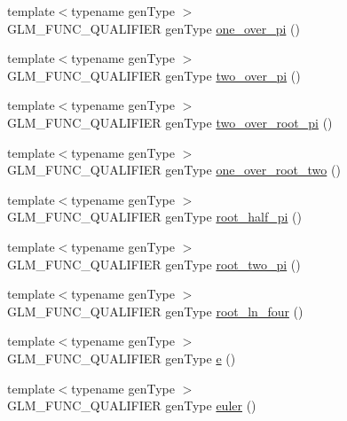 \begin{DoxyCompactItemize}
{\footnotesize template$<$typename gen\-Type $>$ }\\G\-L\-M\-\_\-\-F\-U\-N\-C\-\_\-\-Q\-U\-A\-L\-I\-F\-I\-E\-R gen\-Type \hyperlink{group__gtc__constants_ga9ba09a027db6d4f4e259b01cf5d6c178}{one\-\_\-over\-\_\-pi} ()
\item 
{\footnotesize template$<$typename gen\-Type $>$ }\\G\-L\-M\-\_\-\-F\-U\-N\-C\-\_\-\-Q\-U\-A\-L\-I\-F\-I\-E\-R gen\-Type \hyperlink{group__gtc__constants_ga85729d38c47351686e8659f80447a7ea}{two\-\_\-over\-\_\-pi} ()
\item 
{\footnotesize template$<$typename gen\-Type $>$ }\\G\-L\-M\-\_\-\-F\-U\-N\-C\-\_\-\-Q\-U\-A\-L\-I\-F\-I\-E\-R gen\-Type \hyperlink{group__gtc__constants_ga767e539c20585bf60aa63595b0f0b259}{two\-\_\-over\-\_\-root\-\_\-pi} ()
\item 
{\footnotesize template$<$typename gen\-Type $>$ }\\G\-L\-M\-\_\-\-F\-U\-N\-C\-\_\-\-Q\-U\-A\-L\-I\-F\-I\-E\-R gen\-Type \hyperlink{group__gtc__constants_gac1a9b3248357fd9e9b740bed90e0b1b7}{one\-\_\-over\-\_\-root\-\_\-two} ()
\item 
{\footnotesize template$<$typename gen\-Type $>$ }\\G\-L\-M\-\_\-\-F\-U\-N\-C\-\_\-\-Q\-U\-A\-L\-I\-F\-I\-E\-R gen\-Type \hyperlink{group__gtc__constants_gaec5af85e2148c118aad7e797430fdeb0}{root\-\_\-half\-\_\-pi} ()
\item 
{\footnotesize template$<$typename gen\-Type $>$ }\\G\-L\-M\-\_\-\-F\-U\-N\-C\-\_\-\-Q\-U\-A\-L\-I\-F\-I\-E\-R gen\-Type \hyperlink{group__gtc__constants_gae991b4d39c57b57990054eec3677597c}{root\-\_\-two\-\_\-pi} ()
\item 
{\footnotesize template$<$typename gen\-Type $>$ }\\G\-L\-M\-\_\-\-F\-U\-N\-C\-\_\-\-Q\-U\-A\-L\-I\-F\-I\-E\-R gen\-Type \hyperlink{group__gtc__constants_ga9cae3fad9314e34c1d3aab71fcdef05f}{root\-\_\-ln\-\_\-four} ()
\item 
{\footnotesize template$<$typename gen\-Type $>$ }\\G\-L\-M\-\_\-\-F\-U\-N\-C\-\_\-\-Q\-U\-A\-L\-I\-F\-I\-E\-R gen\-Type \hyperlink{group__gtc__constants_gab83fb6de0f05d6c0d11bdf0479f8319e}{e} ()
\item 
{\footnotesize template$<$typename gen\-Type $>$ }\\G\-L\-M\-\_\-\-F\-U\-N\-C\-\_\-\-Q\-U\-A\-L\-I\-F\-I\-E\-R gen\-Type \hyperlink{group__gtc__constants_ga6f14b46653b7ead1edcbd0fc6c9c5289}{euler} ()

\end{DoxyCompactItemize}
